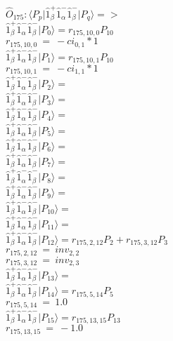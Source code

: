 \documentclass[14pt]{article}
\begin{document}
    $\hat{O}_{175}:  \langle{P_p}\vert \hat{1}_{\beta}^{+}\hat{1}_{\alpha}^{-}\hat{1}_{\beta}^{-} \vert{P_q}\rangle => $ \\ 
    $ \hat{1}_{\beta}^{+}\hat{1}_{\alpha}^{-}\hat{1}_{\beta}^{-} \vert{P_{0}}\rangle = {r}_{175,10,0}P_{10} $ \\ 
    ${r}_{175,10,0}\ =\ -{ci}_{0,1}*1 $ \\ 
    $ \hat{1}_{\beta}^{+}\hat{1}_{\alpha}^{-}\hat{1}_{\beta}^{-} \vert{P_{1}}\rangle = {r}_{175,10,1}P_{10} $ \\ 
    ${r}_{175,10,1}\ =\ -{ci}_{1,1}*1 $ \\ 
    $ \hat{1}_{\beta}^{+}\hat{1}_{\alpha}^{-}\hat{1}_{\beta}^{-} \vert{P_{2}}\rangle =  $ \\ 
    $ \hat{1}_{\beta}^{+}\hat{1}_{\alpha}^{-}\hat{1}_{\beta}^{-} \vert{P_{3}}\rangle =  $ \\ 
    $ \hat{1}_{\beta}^{+}\hat{1}_{\alpha}^{-}\hat{1}_{\beta}^{-} \vert{P_{4}}\rangle =  $ \\ 
    $ \hat{1}_{\beta}^{+}\hat{1}_{\alpha}^{-}\hat{1}_{\beta}^{-} \vert{P_{5}}\rangle =  $ \\ 
    $ \hat{1}_{\beta}^{+}\hat{1}_{\alpha}^{-}\hat{1}_{\beta}^{-} \vert{P_{6}}\rangle =  $ \\ 
    $ \hat{1}_{\beta}^{+}\hat{1}_{\alpha}^{-}\hat{1}_{\beta}^{-} \vert{P_{7}}\rangle =  $ \\ 
    $ \hat{1}_{\beta}^{+}\hat{1}_{\alpha}^{-}\hat{1}_{\beta}^{-} \vert{P_{8}}\rangle =  $ \\ 
    $ \hat{1}_{\beta}^{+}\hat{1}_{\alpha}^{-}\hat{1}_{\beta}^{-} \vert{P_{9}}\rangle =  $ \\ 
    $ \hat{1}_{\beta}^{+}\hat{1}_{\alpha}^{-}\hat{1}_{\beta}^{-} \vert{P_{10}}\rangle =  $ \\ 
    $ \hat{1}_{\beta}^{+}\hat{1}_{\alpha}^{-}\hat{1}_{\beta}^{-} \vert{P_{11}}\rangle =  $ \\ 
    $ \hat{1}_{\beta}^{+}\hat{1}_{\alpha}^{-}\hat{1}_{\beta}^{-} \vert{P_{12}}\rangle = {r}_{175,2,12}P_{2}+{r}_{175,3,12}P_{3} $ \\ 
    ${r}_{175,2,12}\ =\ {inv}_{2,2} $ \\ 
    ${r}_{175,3,12}\ =\ {inv}_{2,3} $ \\ 
    $ \hat{1}_{\beta}^{+}\hat{1}_{\alpha}^{-}\hat{1}_{\beta}^{-} \vert{P_{13}}\rangle =  $ \\ 
    $ \hat{1}_{\beta}^{+}\hat{1}_{\alpha}^{-}\hat{1}_{\beta}^{-} \vert{P_{14}}\rangle = {r}_{175,5,14}P_{5} $ \\ 
    ${r}_{175,5,14}\ =\ 1.0 $ \\ 
    $ \hat{1}_{\beta}^{+}\hat{1}_{\alpha}^{-}\hat{1}_{\beta}^{-} \vert{P_{15}}\rangle = {r}_{175,13,15}P_{13} $ \\ 
    ${r}_{175,13,15}\ =\ -1.0 $ \\ 
    
\end{document}
